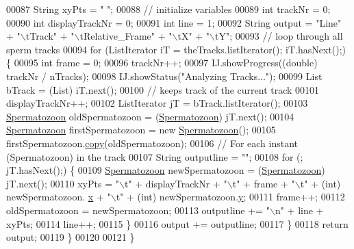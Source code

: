 \begin{DoxyCode}
00087     String xyPts = \textcolor{stringliteral}{" "};
00088     \textcolor{comment}{// initialize variables}
00089     \textcolor{keywordtype}{int} trackNr = 0;
00090     \textcolor{keywordtype}{int} displayTrackNr = 0;
00091     \textcolor{keywordtype}{int} line = 1;
00092     String output = \textcolor{stringliteral}{"Line"} + \textcolor{stringliteral}{"\(\backslash\)tTrack"} + \textcolor{stringliteral}{"\(\backslash\)tRelative\_Frame"} + \textcolor{stringliteral}{"\(\backslash\)tX"} + \textcolor{stringliteral}{"\(\backslash\)tY"};
00093     \textcolor{comment}{// loop through all sperm tracks}
00094     \textcolor{keywordflow}{for} (ListIterator iT = theTracks.listIterator(); iT.hasNext();) \{
00095       \textcolor{keywordtype}{int} frame = 0;
00096       trackNr++;
00097       IJ.showProgress((\textcolor{keywordtype}{double}) trackNr / nTracks);
00098       IJ.showStatus(\textcolor{stringliteral}{"Analyzing Tracks..."});
00099       List bTrack = (List) iT.next();
00100       \textcolor{comment}{// keeps track of the current track}
00101       displayTrackNr++;
00102       ListIterator jT = bTrack.listIterator();
00103       \hyperlink{classdata_1_1_spermatozoon}{Spermatozoon} oldSpermatozoon = (\hyperlink{classdata_1_1_spermatozoon}{Spermatozoon}) jT.next();
00104       \hyperlink{classdata_1_1_spermatozoon}{Spermatozoon} firstSpermatozoon = \textcolor{keyword}{new} \hyperlink{classdata_1_1_spermatozoon}{Spermatozoon}();
00105       firstSpermatozoon.\hyperlink{classdata_1_1_spermatozoon_ac4622d389badba1a387ec1e139d35c8e}{copy}(oldSpermatozoon);
00106       \textcolor{comment}{// For each instant (Spermatozoon) in the track}
00107       String outputline = \textcolor{stringliteral}{""};
00108       \textcolor{keywordflow}{for} (; jT.hasNext();) \{
00109         \hyperlink{classdata_1_1_spermatozoon}{Spermatozoon} newSpermatozoon = (\hyperlink{classdata_1_1_spermatozoon}{Spermatozoon}) jT.next();
00110         xyPts = \textcolor{stringliteral}{"\(\backslash\)t"} + displayTrackNr + \textcolor{stringliteral}{"\(\backslash\)t"} + frame + \textcolor{stringliteral}{"\(\backslash\)t"} + (int) newSpermatozoon.
      \hyperlink{classdata_1_1_spermatozoon_ad0da36b2558901e21e7a30f6c227a45e}{x} + \textcolor{stringliteral}{"\(\backslash\)t"} + (\textcolor{keywordtype}{int}) newSpermatozoon.\hyperlink{classdata_1_1_spermatozoon_aa4f0d3eebc3c443f9be81bf48561a217}{y};
00111         frame++;
00112         oldSpermatozoon = newSpermatozoon;
00113         outputline += \textcolor{stringliteral}{"\(\backslash\)n"} + line + xyPts;
00114         line++;
00115       \}
00116       output += outputline;
00117     \}
00118     \textcolor{keywordflow}{return} output;
00119   \}
00120   
00121 \}
\end{DoxyCode}
